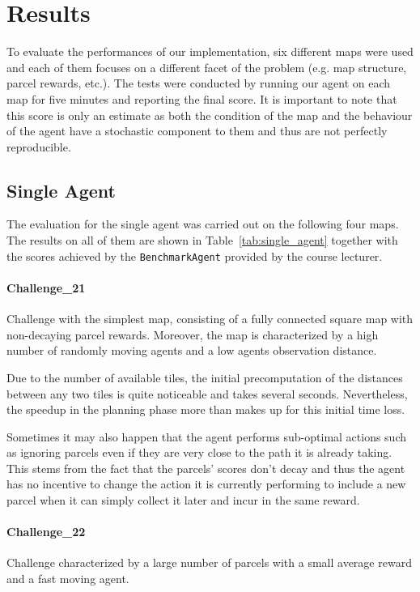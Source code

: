 \section{Results}
\label{sec:results}

To evaluate the performances of our implementation, six different maps were used and each of them focuses on a different facet of the problem (e.g. map structure, parcel rewards, etc.). The tests were conducted by running our agent on each map for five minutes and reporting the final score. It is important to note that this score is only an estimate as both the condition of the map and the behaviour of the agent have a stochastic component to them and thus are not perfectly reproducible.

\subsection{Single Agent}
The evaluation for the single agent was carried out on the following four maps. The results on all of them are shown in Table~\ref{tab:single_agent} together with the scores achieved by the \texttt{BenchmarkAgent} provided by the course lecturer.

\paragraph{Challenge\_21} Challenge with the simplest map, consisting of a fully connected square map with non-decaying parcel rewards. Moreover, the map is characterized by a high number of randomly moving agents and a low agents observation distance.

Due to the number of available tiles, the initial precomputation of the distances between any two tiles is quite noticeable and takes several seconds. Nevertheless, the speedup in the planning phase more than makes up for this initial time loss.

Sometimes it may also happen that the agent performs sub-optimal actions such as ignoring parcels even if they are very close to the path it is already taking. This stems from the fact that the parcels' scores don't decay and thus the agent has no incentive to change the action it is currently performing to include a new parcel when it can simply collect it later and incur in the same reward.

\paragraph{Challenge\_22} Challenge characterized by a large number of parcels with a small average reward and a fast moving agent.

